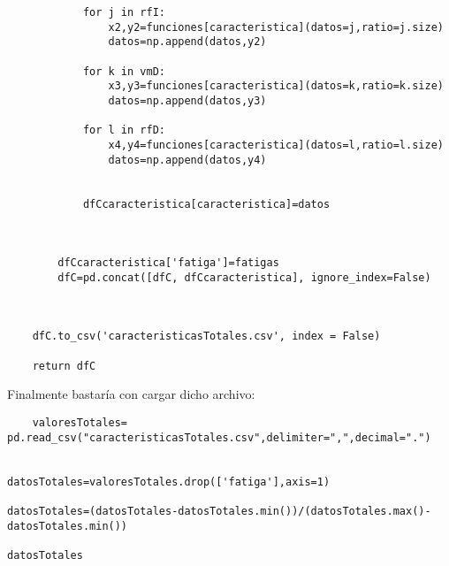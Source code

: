 \begin{lstlisting}
            for j in rfI:
                x2,y2=funciones[caracteristica](datos=j,ratio=j.size)
                datos=np.append(datos,y2)
                
            for k in vmD:
                x3,y3=funciones[caracteristica](datos=k,ratio=k.size)
                datos=np.append(datos,y3)
                
            for l in rfD:
                x4,y4=funciones[caracteristica](datos=l,ratio=l.size)
                datos=np.append(datos,y4)
                
                
            dfCcaracteristica[caracteristica]=datos
            
        
        
        dfCcaracteristica['fatiga']=fatigas
        dfC=pd.concat([dfC, dfCcaracteristica], ignore_index=False)
             
                
    
    dfC.to_csv('caracteristicasTotales.csv', index = False)
    
    return dfC
    \end{lstlisting}
    
    Finalmente bastaría con cargar dicho archivo:
    \begin{lstlisting}
    valoresTotales= pd.read_csv("caracteristicasTotales.csv",delimiter=",",decimal=".")


datosTotales=valoresTotales.drop(['fatiga'],axis=1)

datosTotales=(datosTotales-datosTotales.min())/(datosTotales.max()-datosTotales.min())

datosTotales
    \end{lstlisting}
   